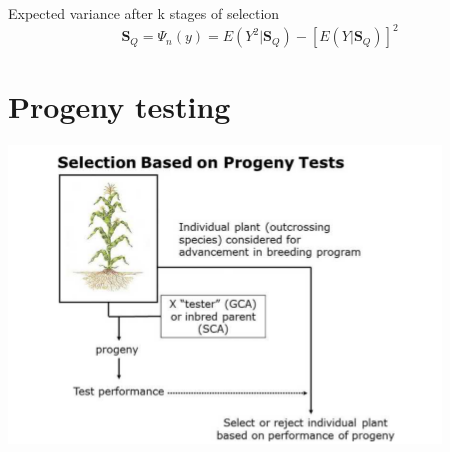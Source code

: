 \documentclass[11pt,ignorenonframetext,aspectratio=169]{beamer}
\begin{document}
\begin{frame}{Expected variance after k stages of selection}
\protect\hypertarget{expected-variance-after-k-stages-of-selection}{}
\[
\textbf{S}_{Q} = \Psi_n(y) = E(Y^2|\textbf{S}_{Q})- \left[E(Y|\textbf{S}_{Q})\right]^2
\]
\end{frame}

\hypertarget{progeny-testing}{%
\section{Progeny testing}\label{progeny-testing}}

\begin{frame}{}
\protect\hypertarget{section-3}{}
\begin{center}\includegraphics[width=0.6\linewidth]{./images/selection_based_on_progeny_test} \end{center}
\end{frame}
\end{document}
